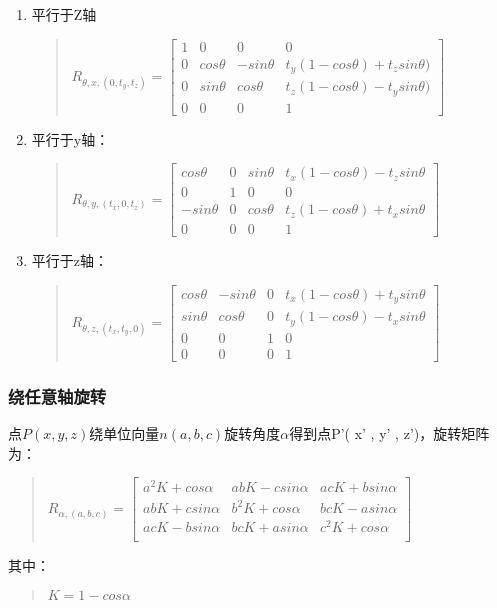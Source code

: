 \documentclass[a4paper,10pt]{article}
\begin{document}
\begin{CJK}{UTF8}{song}
\begin{quote}
\end{quote}
\begin{enumerate}
\item 平行于Z轴
\begin{quote}
$
R_{\theta,x,(0,t_y,t_z)}=
\left[\begin{array}{cccc}
1 & 0 & 0 & 0 \\
0 & cos\theta & -sin\theta & t_y(1-cos\theta)+t_{z}sin\theta) \\
0 & sin\theta & cos\theta & t_z(1-cos\theta)-t_{y}sin\theta) \\
0 & 0 & 0 & 1 
\end{array} \right]
$
\end{quote}
\item 平行于y轴：
\begin{quote}
$
R_{\theta,y,(t_x,0,t_z)}=
\left[\begin{array}{cccc}
cos\theta  & 0  & sin\theta  & t_{x}(1-cos\theta)-t_{z}sin\theta \\
0 & 1 & 0 & 0 \\
-sin\theta & 0 & cos\theta & t_{z}(1-cos\theta)+t_{x}sin\theta  \\
0 & 0 & 0 & 1 
\end{array}\right]
$
\end{quote}
\item 平行于z轴：
\begin{quote}
$
R_{\theta,z,(t_x,t_y,0)}=
\left[\begin{array}{cccc}
cos\theta  & -sin\theta & 0 & t_{x}(1-cos\theta)+t_{y}sin\theta \\
sin\theta  & cos\theta & 0 & t_{y}(1-cos\theta)-t_{x}sin\theta \\
0 & 0  & 1 &0  \\
0 & 0& 0& 1
\end{array} \right]
$
\end{quote}
\end{enumerate}

\subsubsection{绕任意轴旋转}
点$P( x , y , z )$绕单位向量$n( a , b ,c )$旋转角度$\alpha$得到点P'( x' , y' , z')，旋转矩阵为：
\begin{quote}
$
R_{\alpha,(a,b,c)}=
\left[\begin{array}{ccc}
a^{2}K+cos\alpha & abK-csin\alpha & acK+bsin\alpha \\
abK+csin\alpha & b^{2}K+cos\alpha & bcK-asin\alpha \\
acK-bsin\alpha & bcK+asin\alpha & c^{2}K+cos\alpha \\
\end{array}\right]
$
\end{quote}
其中：
\begin{quote}
 $K=1-cos\alpha $
\end{quote}




\end{CJK}
\end{document}
